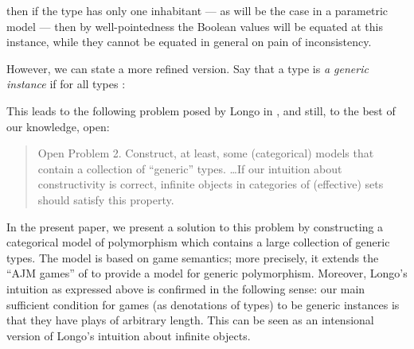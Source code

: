 \documentclass[a4paper,11pt]{article}
\begin{document}
then if the type  has only one
inhabitant --- as will be the case in a parametric model --- then by
well-pointedness the Boolean values will be equated at this instance,
while they cannot be equated in general on pain of inconsistency.

However, we can state a more refined version. Say that a type  is
\emph{a generic instance} if for all types :

This leads to the following problem posed by Longo in  \cite{Lon95}, and
still, to the best of our knowledge, open:
\begin{quotation}
Open Problem 2. Construct, at least, some (categorical) models that
contain a collection of ``generic'' types. \ldots If our intuition
about constructivity is correct, infinite objects in categories of
(effective) sets should satisfy this property.
\end{quotation}

In the present paper, we present a solution to this problem by
constructing a categorical model of polymorphism which contains a
large collection of generic types. The model is based on game
semantics; more precisely, it extends the ``AJM games'' of \cite{AJM00} to
provide a model for generic polymorphism. Moreover, Longo's intuition
as expressed above is confirmed in the following sense: our main
sufficient condition for games (as denotations of types) to be generic
instances is that they have plays of arbitrary length. This can be
seen as an intensional version of Longo's intuition about infinite
objects.
\end{document}
